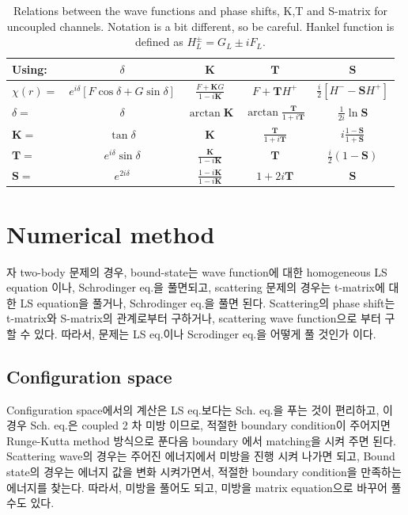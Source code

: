 \documentclass[10pt]{article}
\def\bm{\boldsymbol}
\begin{document}
\begin{table}
\begin{center}
\caption{Relations between the wave functions 
and phase shifts, K,T and S-matrix for uncoupled channels.
Notation is a bit different, so be careful. Hankel function 
is defined as $H^{\pm}_L=G_L\pm i F_L$. 
}
\begin{tabular}{lcccc}
\hline
Using: & $\delta$ & ${\bm K}$ & ${\bm T}$ & ${\bm S}$ \\
\hline
$\chi(r)=$ & $e^{i\delta}[F\cos\delta+G\sin\delta] $
           & $\frac{F+{\bm K}G}{1-i{\bm K}}$
           & $F+{\bm T}H^{+}$
           & $\frac{i}{2}[H^{-}-{\bm S} H^{+}]$ \\
$\delta=$  & $\delta$  
           & $\arctan{\bm K}$
           & $\arctan\frac{\bm T}{1+i{\bm T}}$
           & $\frac{1}{2i}\ln {\bm S}$\\ 
${\bm K}=$ & $\tan\delta$ 
           & ${\bm K}$
           & $\frac{\bm T}{1+i{\bm T}}$
           & $i\frac{1-{\bm S}}{1+{\bm S}}$ \\
${\bm T}=$ & $e^{i\delta}\sin\delta$
           & $\frac{\bm K}{1-i{\bm K}}$
           & ${\bm T}$
           & $\frac{i}{2}(1-{\bm S})$ \\
${\bm S}=$ & $e^{2i\delta}$ 
           & $\frac{1-i{\bm K}}{1-i{\bm K}}$
           & $1+2i{\bm T}$
           & ${\bm S}$\\
\hline
\end{tabular}
\end{center}
\end{table}


\newpage
\section{Numerical method}
자 two-body 문제의 경우, bound-state는 wave function에 대한 
homogeneous LS equation 이나, Schrodinger eq.을 풀면되고,
scattering 문제의 경우는 t-matrix에 대한 LS equation을 풀거나,
Schrodinger eq.을 풀면 된다. Scattering의 phase shift는 
t-matrix와 S-matrix의 관계로부터 구하거나, scattering wave function으로 부터 구할 수 있다.
따라서, 문제는 LS eq.이나 Scrodinger eq.을 어떻게 풀 것인가 이다.

\subsection{Configuration space}
Configuration space에서의 계산은 LS eq.보다는 Sch. eq.을 푸는 것이 편리하고,
이 경우 Sch. eq.은 coupled 2 차 미방 이므로, 
적절한 boundary condition이 주어지면 
Runge-Kutta method 방식으로 푼다음 boundary 에서 matching을 시켜 주면 된다.
Scattering wave의 경우는 주어진 에너지에서 미방을 진행 시켜 나가면 되고,
Bound state의 경우는 에너지 값을 변화 시켜가면서, 적절한 boundary condition을 만족하는 
에너지를 찾는다.  
따라서, 미방을 풀어도 되고, 미방을 matrix equation으로 바꾸어 풀 수도 있다. 
\end{document}
